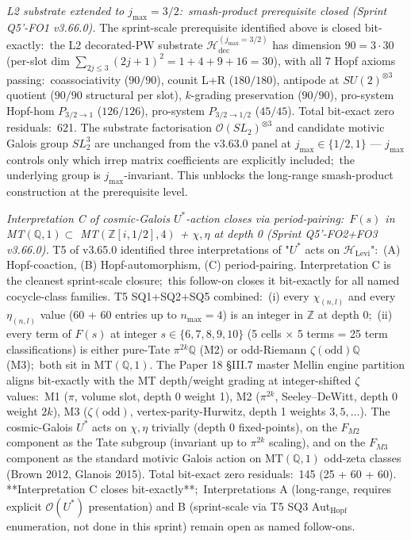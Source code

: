 \documentclass[11pt,a4paper]{article}
\theoremstyle{plain}
\theoremstyle{definition}
\begin{document}
\emph{L2 substrate extended to $j_{\max} = 3/2$:\ smash-product prerequisite
closed (Sprint Q5'-FO1 v3.66.0).}
The sprint-scale prerequisite identified above is closed bit-exactly:\
the L2 decorated-PW substrate $\mathcal{H}_{\mathrm{dec}}^{(j_{\max} = 3/2)}$
has dimension $90 = 3 \cdot 30$ (per-slot dim
$\sum_{2j \le 3}(2j+1)^2 = 1+4+9+16 = 30$), with all 7 Hopf axioms
passing:\ coassociativity ($90/90$), counit L+R ($180/180$), antipode
at $SU(2)^{\otimes 3}$ quotient ($90/90$ structural per slot),
$k$-grading preservation ($90/90$), pro-system Hopf-hom
$P_{3/2 \to 1}$ ($126/126$), pro-system $P_{3/2 \to 1/2}$
($45/45$). Total bit-exact zero residuals:\ 621.  The substrate
factorisation $\mathcal{O}(SL_2)^{\otimes 3}$ and candidate motivic
Galois group $SL_2^3$ are unchanged from the v3.63.0 panel at
$j_{\max} \in \{1/2, 1\}$ — $j_{\max}$ controls only which irrep matrix
coefficients are explicitly included;\ the underlying group is
$j_{\max}$-invariant.  This unblocks the long-range smash-product
construction at the prerequisite level.

\emph{Interpretation C of cosmic-Galois $U^*$-action closes via
period-pairing:\ $F(s)$ in MT$(\mathbb{Q}, 1) \subset$
MT$(\mathbb{Z}[i, 1/2], 4)$ + $\chi, \eta$ at depth 0 (Sprint Q5'-FO2+FO3
v3.66.0).}  T5 of v3.65.0
identified three interpretations of "$U^*$ acts on $\mathcal{H}_{\mathrm{Levi}}$":\
(A) Hopf-coaction, (B) Hopf-automorphism, (C) period-pairing.
Interpretation C is the cleanest sprint-scale closure;\ this
follow-on closes it bit-exactly for all named cocycle-class families.
T5 SQ1+SQ2+SQ5 combined:\ (i) every $\chi_{(n, l)}$ and every
$\eta_{(n, l)}$ value (60 + 60 entries up to $n_{\max} = 4$) is an
integer in $\mathbb{Z}$ at depth 0;\ (ii) every term of $F(s)$ at integer
$s \in \{6, 7, 8, 9, 10\}$ (5 cells $\times$ 5 terms = 25 term
classifications) is either pure-Tate $\pi^{2k}\mathbb{Q}$ (M2) or
odd-Riemann $\zeta(\mathrm{odd})\mathbb{Q}$ (M3);\ both sit in MT$(\mathbb{Q}, 1)$.
The Paper 18 \S III.7 master Mellin engine partition aligns bit-exactly
with the MT depth/weight grading at integer-shifted $\zeta$ values:\
M1 ($\pi$, volume slot, depth 0 weight 1), M2 ($\pi^{2k}$,
Seeley--DeWitt, depth 0 weight $2k$), M3 ($\zeta(\mathrm{odd})$,
vertex-parity-Hurwitz, depth 1 weights $3, 5, \dots$). The cosmic-Galois
$U^*$ acts on $\chi, \eta$ trivially (depth 0 fixed-points), on the
$F_{M2}$ component as the Tate subgroup (invariant up to $\pi^{2k}$
scaling), and on the $F_{M3}$ component as the standard motivic Galois
action on $\mathrm{MT}(\mathbb{Q}, 1)$ odd-zeta classes (Brown 2012,
Glanois 2015).  Total bit-exact zero residuals:\ 145 (25 + 60 + 60).
**Interpretation C closes bit-exactly**;\ Interpretations A
(long-range, requires explicit $\mathcal{O}(U^*)$ presentation) and B
(sprint-scale via T5 SQ3 Aut$_{\mathrm{Hopf}}$ enumeration, not done in
this sprint) remain open as named follow-ons.
\end{document}
